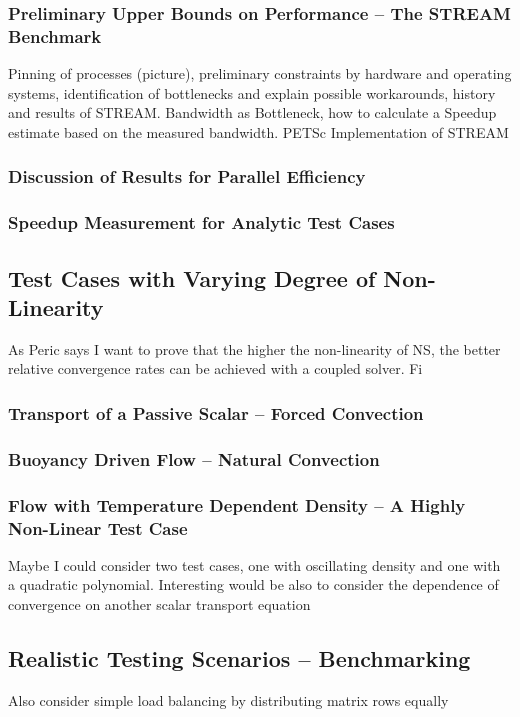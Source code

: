 \documentclass[article,type=msc,colorback,accentcolor=tud2a]{tudthesis}
\begin{document}
      \subsubsection{Preliminary Upper Bounds on Performance -- The STREAM Benchmark}
        Pinning of processes (picture), preliminary constraints by hardware and operating systems, identification of bottlenecks and explain possible workarounds, history and results of STREAM. Bandwidth as Bottleneck, how to calculate a Speedup estimate based on the measured bandwidth. PETSc Implementation of STREAM
      \subsubsection{Discussion of Results for Parallel Efficiency}
      \subsubsection{Speedup Measurement for Analytic Test Cases}

    \subsection{Test Cases with Varying Degree of Non-Linearity}
      
      As Peric says I want to prove that the higher the non-linearity of NS, the better relative convergence rates can be achieved with a coupled solver. Fi

      \subsubsection{Transport of a Passive Scalar -- Forced Convection}
      \subsubsection{Buoyancy Driven Flow -- Natural Convection}
      \subsubsection{Flow with Temperature Dependent Density -- A Highly Non-Linear Test Case}
        Maybe I could consider two test cases, one with oscillating density and one with a quadratic polynomial. Interesting would be also to consider the dependence of convergence on another scalar transport equation

    \subsection{Realistic Testing Scenarios -- Benchmarking}
        Also consider simple load balancing by distributing matrix rows equally
      
\end{document}
